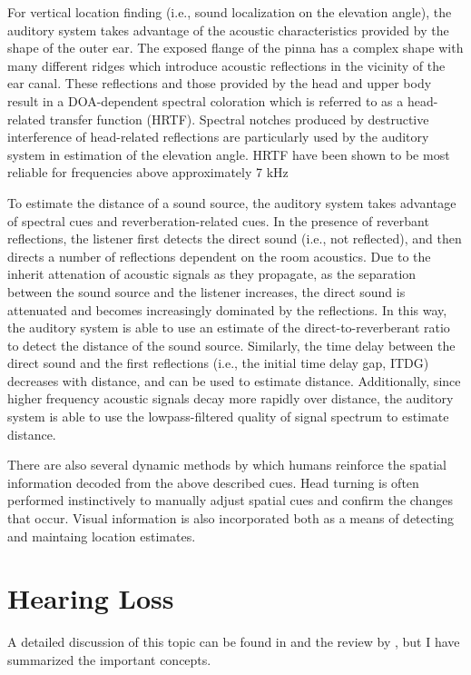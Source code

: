 For vertical location finding (i.e., sound localization on the elevation angle), the auditory system takes advantage of the acoustic characteristics provided by the shape of the outer ear. The exposed flange of the pinna has a complex shape with many different ridges which introduce acoustic reflections in the vicinity of the ear canal. These reflections and those provided by the head and upper body result in a DOA-dependent spectral coloration which is referred to as a head-related transfer function (HRTF). Spectral notches produced by destructive interference of head-related reflections are particularly used by the auditory system in estimation of the elevation angle. HRTF have been shown to be most reliable for frequencies above approximately 7 kHz

To estimate the distance of a sound source, the auditory system takes advantage of spectral cues and reverberation-related cues. In the presence of reverbant reflections, the listener first detects the direct sound (i.e., not reflected), and then directs a number of reflections dependent on the room acoustics. Due to the inherit attenation of acoustic signals as they propagate, as the separation between the sound source and the listener increases, the direct sound is attenuated and becomes increasingly dominated by the reflections. In this way, the auditory system is able to use an estimate of the direct-to-reverberant ratio to detect the distance of the sound source. Similarly, the time delay between the direct sound and the first reflections (i.e., the initial time delay gap, ITDG) decreases with distance, and can be used to estimate distance. Additionally, since higher frequency acoustic signals decay more rapidly over distance, the auditory system is able to use the lowpass-filtered quality of signal spectrum to estimate distance.

There are also several dynamic methods by which humans reinforce the spatial information decoded from the above described cues. Head turning is often performed instinctively to manually adjust spatial cues and confirm the changes that occur. Visual information is also incorporated both as a means of detecting and maintaing location estimates.

\section{Hearing Loss}

A detailed discussion of this topic can be found in \cite{pickles2013} and the review by \cite{shapiro2021hearing}, but I have summarized the important concepts. 

